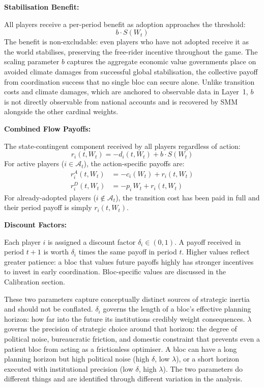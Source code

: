 \documentclass[10pt,a4paper]{article}
\newcommand{\bpar}[1]{%
  \par\addvspace{\medskipamount}%
  \needspace{4\baselineskip}%
  \noindent\textbf{#1}\par\nopagebreak[4]%
}
\begin{document}
\bpar{Stabilisation Benefit:}
All players receive a per-period benefit as adoption approaches the threshold:
\[
b \cdot S(W_t)
\]
The benefit is non-excludable: even players who have not adopted receive it as the world
stabilises, preserving the free-rider incentive throughout the game. The scaling parameter $b$
captures the aggregate economic value governments place on avoided climate damages from
successful global stabilisation, the collective payoff from coordination success that no single
bloc can secure alone. Unlike transition costs and climate damages, which are anchored to
observable data in Layer~1, $b$ is not directly observable from national accounts and is
recovered by SMM alongside the other cardinal weights.

\bpar{Combined Flow Payoffs:}
The state-contingent component received by all players regardless of action:
\[
r_i(t, W_t) = -d_i(t, W_t) + b \cdot S(W_t)
\]
For active players ($i \in \mathcal{A}_t$), the action-specific payoffs are:
\begin{align*}
r_i^A(t, W_t) &= -c_i(W_t) + r_i(t, W_t) \\
r_i^D(t, W_t) &= -p_i\, W_t + r_i(t, W_t)
\end{align*}
For already-adopted players ($i \notin \mathcal{A}_t$), the transition cost has been paid in
full and their period payoff is simply $r_i(t, W_t)$.

\bpar{Discount Factors:}
Each player $i$ is assigned a discount factor $\delta_i \in (0,1)$. A payoff received in
period $t+1$ is worth $\delta_i$ times the same payoff in period $t$. Higher values reflect
greater patience: a bloc that values future payoffs highly has stronger incentives to invest
in early coordination. Bloc-specific values are discussed in the Calibration section.

These two parameters capture conceptually distinct sources of strategic inertia and should
not be conflated. $\delta_i$ governs the length of a bloc's effective planning horizon:
how far into the future its institutions credibly weight consequences. $\lambda$ governs the
precision of strategic choice around that horizon: the degree of political noise, bureaucratic
friction, and domestic constraint that prevents even a patient bloc from acting as a
frictionless optimiser. A bloc can have a long planning horizon but high political noise
(high $\delta$, low $\lambda$), or a short horizon executed with institutional precision
(low $\delta$, high $\lambda$). The two parameters do different things and are identified
through different variation in the analysis.
\end{document}
